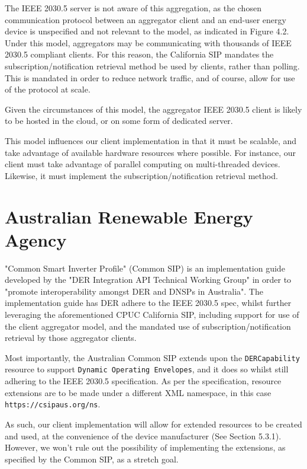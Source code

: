 The IEEE 2030.5 server is not aware of this aggregation, as the chosen communication protocol between an aggregator client and an end-user energy device is unspecified and not relevant to the model, as indicated in Figure 4.2.
Under this model, aggregators may be communicating with thousands of IEEE 2030.5 compliant clients. For this reason, the California SIP mandates the subscription/notification retrieval method be used by clients, rather than polling.
This is mandated in order to reduce network traffic, and of course, allow for use of the protocol at scale.

Given the circumstances of this model, the aggregator IEEE 2030.5 client is likely to be hosted in the cloud, or on some form of dedicated server.

This model influences our client implementation in that it must be scalable, and take advantage of available hardware resources where possible. For instance, our client must take advantage of parallel computing on multi-threaded devices.
Likewise, it must implement the subscription/notification retrieval method.


\section{Australian Renewable Energy Agency}
"Common Smart Inverter Profile" (Common SIP) is an implementation guide developed by the "DER Integration API Technical Working Group" in order to "promote interoperability amongst DER and DNSPs in Australia".
The implementation guide has DER adhere to the IEEE 2030.5 spec, whilst further leveraging the aforementioned CPUC California SIP, including support for use of the client aggregator model, and the mandated use of subscription/notification retrieval by those aggregator clients. \cite[]{CSIPAus}

Most importantly, the Australian Common SIP extends upon the \texttt{DERCapability} resource to support \texttt{Dynamic Operating Envelopes}, and it does so whilst still adhering to the IEEE 2030.5 specification.
As per the specification, resource extensions are to be made under a different XML namespace, in this case \texttt{https://csipaus.org/ns}. \cite[]{CSIPAus}

As such, our client implementation will allow for extended resources to be created and used, at the convenience of the device manufacturer (See Section 5.3.1). 
However, we won't rule out the possibility of implementing the extensions, as specified by the Common SIP, as a stretch goal. 
